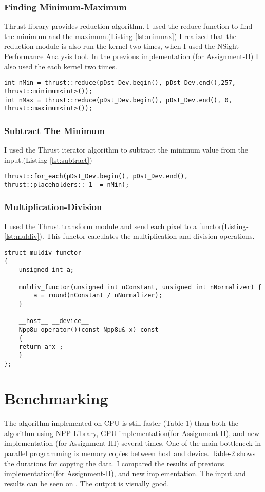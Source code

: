 \documentclass[11pt]{article} %
\begin{document}
	\subsubsection{Finding Minimum-Maximum} Thrust library provides reduction algorithm. I used the reduce function to find the minimum and the maximum.(Listing-\ref{lst:minmax})  I realized that the reduction module is also run the kernel two times, when I used the NSight Performance Analysis tool. In the previous implementation (for Assignment-II) I also used the each kernel two times.
		\begin{lstlisting}[caption={Functor},label={lst:minmax}]
int nMin = thrust::reduce(pDst_Dev.begin(), pDst_Dev.end(),257, thrust::minimum<int>());
int nMax = thrust::reduce(pDst_Dev.begin(), pDst_Dev.end(), 0, thrust::maximum<int>());
		\end{lstlisting}
\hfill
	\subsubsection{Subtract The Minimum} I used the Thrust iterator algorithm to subtract the minimum value from the input.(Listing-\ref{lst:subtract})
		\begin{lstlisting}[caption={Functor},label={lst:subtract}]
thrust::for_each(pDst_Dev.begin(), pDst_Dev.end(), thrust::placeholders::_1 -= nMin);
		\end{lstlisting}
		\hfill	
	\subsubsection{Multiplication-Division}  I used the Thrust transform module and send each pixel to a functor(Listing-\ref{lst:muldiv}). This functor calculates the multiplication and division operations.
		\begin{lstlisting}[caption={Functor},label={lst:muldiv}]
struct muldiv_functor
{
	unsigned int a;

	muldiv_functor(unsigned int nConstant, unsigned int nNormalizer) {
		a = round(nConstant / nNormalizer); 
	}

	__host__ __device__
	Npp8u operator()(const Npp8u& x) const
	{
	return a*x ;
	}
};
		\end{lstlisting}
		\hfill
\section{Benchmarking}

	\justifying  The algorithm implemented on CPU is still faster (Table-1) than both the algorithm using NPP Library, GPU implementation(for Assignment-II), and new implementation (for Assignment-III) several times. One of the main bottleneck in parallel programming is memory copies between host and
	device. Table-2 shows the durations for copying the data. I compared the results of previous implementation(for Assignment-II), and new implementation. The input and results can be seen on .  The output is visually good.   \\
	
\end{document}
